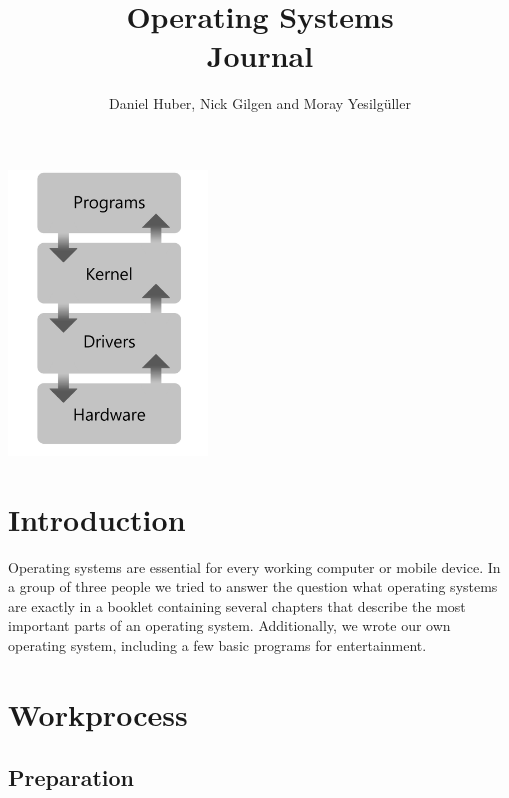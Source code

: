 \documentclass{article}
\title{%
	Operating Systems \\
	\large Journal
	}
\author{Daniel Huber, Nick Gilgen and Moray Yesilgüller}
\begin{document}
\maketitle

\vspace*{\fill}

\includegraphics[width=200px]{ostp}

\bigskip
\bigskip
\bigskip
\bigskip

\newpage

\tableofcontents


\section{Introduction}

Operating systems are essential for every working computer or mobile device. In a group of three people we tried to answer the question what operating 
systems are exactly in a booklet containing several chapters that describe the most important parts of an operating system. Additionally, we wrote our own 
operating system, including a few basic programs for entertainment.

\section{Workprocess}

\subsection{Preparation}
\end{document}
